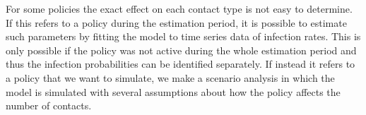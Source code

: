 For some policies the exact effect on each contact type is not easy to determine. If
this refers to a policy during the estimation period, it is possible to estimate such
parameters by fitting the model to time series data of infection rates. This is only
possible if the policy was not active during the whole estimation period and thus the
infection probabilities can be identified separately. If instead it refers to a policy
that we want to simulate, we make a scenario analysis in which the model is simulated
with several assumptions about how the policy affects the number of contacts.
